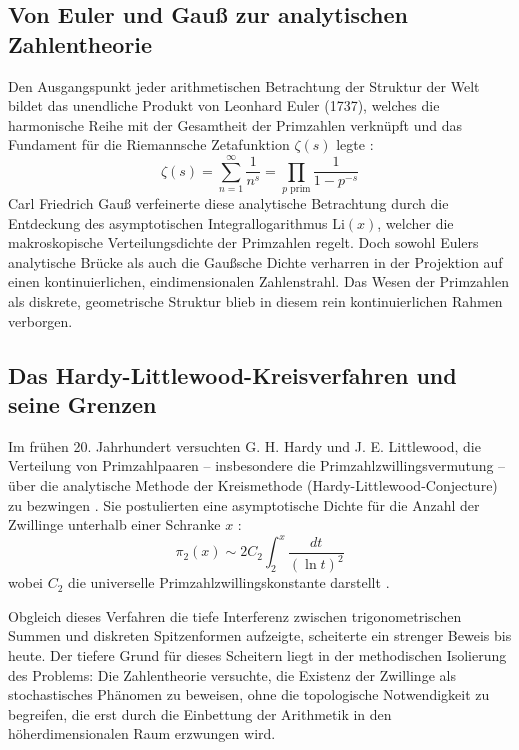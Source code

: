 \documentclass[11pt,a4paper]{article}
\theoremstyle{definition}
\begin{document}
	\subsection{Von Euler und Gauß zur analytischen Zahlentheorie}
	Den Ausgangspunkt jeder arithmetischen Betrachtung der Struktur der Welt bildet das unendliche Produkt von Leonhard Euler (1737), welches die harmonische Reihe mit der Gesamtheit der Primzahlen verknüpft und das Fundament für die Riemannsche Zetafunktion $\zeta(s)$ legte \cite{hilbert}:
	\begin{equation}
		\zeta(s) = \sum_{n=1}^{\infty} \frac{1}{n^s} = \prod_{p \text{ prim}} \frac{1}{1 - p^{-s}}
	\end{equation}
	Carl Friedrich Gauß verfeinerte diese analytische Betrachtung durch die Entdeckung des asymptotischen Integrallogarithmus $\text{Li}(x)$, welcher die makroskopische Verteilungsdichte der Primzahlen regelt. Doch sowohl Eulers analytische Brücke als auch die Gaußsche Dichte verharren in der Projektion auf einen kontinuierlichen, eindimensionalen Zahlenstrahl. Das Wesen der Primzahlen als diskrete, geometrische Struktur blieb in diesem rein kontinuierlichen Rahmen verborgen.
	
	\subsection{Das Hardy-Littlewood-Kreisverfahren und seine Grenzen}
	Im frühen 20. Jahrhundert versuchten G. H. Hardy und J. E. Littlewood, die Verteilung von Primzahlpaaren -- insbesondere die Primzahlzwillingsvermutung -- über die analytische Methode der Kreismethode (Hardy-Littlewood-Conjecture) zu bezwingen \cite{hardy}. Sie postulierten eine asymptotische Dichte für die Anzahl der Zwillinge unterhalb einer Schranke $x$ \cite{hardy}:
	\begin{equation}
		\pi_2(x) \sim 2 C_2 \int_2^x \frac{dt}{(\ln t)^2}
	\end{equation}
	wobei $C_2$ die universelle Primzahlzwillingskonstante darstellt \cite{hardy}.
	
	Obgleich dieses Verfahren die tiefe Interferenz zwischen trigonometrischen Summen und diskreten Spitzenformen aufzeigte, scheiterte ein strenger Beweis bis heute. Der tiefere Grund für dieses Scheitern liegt in der methodischen Isolierung des Problems: Die Zahlentheorie versuchte, die Existenz der Zwillinge als stochastisches Phänomen zu beweisen, ohne die topologische Notwendigkeit zu begreifen, die erst durch die Einbettung der Arithmetik in den höherdimensionalen Raum erzwungen wird.
	
\end{document}

